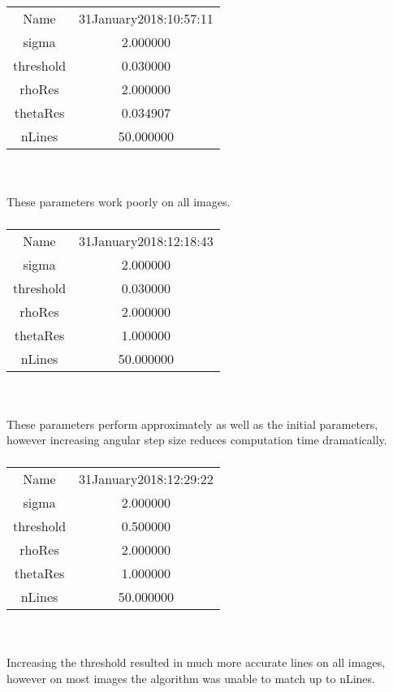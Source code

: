 \documentclass[12pt]{article}
\begin{document}
\subsubsection{}
\begin{tabular} { c c }
Name  &  31January2018:10:57:11 \\
sigma  &  2.000000 \\
threshold  &  0.030000 \\
rhoRes & 2.000000 \\
thetaRes & 0.034907 \\
nLines & 50.000000 
\end{tabular}
\\ \\
These parameters work poorly on all images.

\subsubsection{}
\begin{tabular} { c c }
Name & 31January2018:12:18:43\\
sigma & 2.000000\\
threshold & 0.030000\\
rhoRes & 2.000000\\
thetaRes & 1.000000\\
nLines & 50.000000
\end{tabular}
\\ \\
These parameters perform approximately as well as the initial parameters, however increasing angular step size reduces computation time dramatically.

\subsubsection{}
\begin{tabular} { c c }
Name & 31January2018:12:29:22\\
sigma & 2.000000\\
threshold & 0.500000\\
rhoRes & 2.000000\\
thetaRes & 1.000000\\
nLines & 50.000000
\end{tabular}
\\ \\
Increasing the threshold resulted in much more accurate lines on all images, however on most images the algorithm was unable to match up to nLines.
\end{document}

